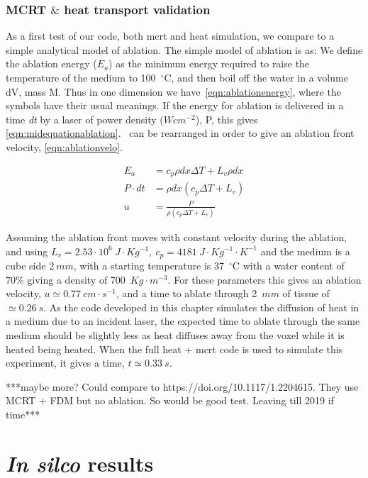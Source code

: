 \subsubsection{MCRT $\&$ heat transport validation}

As a first test of our code, both \gls{mcrt} and heat simulation, we compare to a simple analytical model of ablation. The simple model of ablation is as: We define the ablation energy ($E_a$) as the minimum energy required to raise the temperature of the medium to 100~$^{\circ}$C, and then boil off the water in a volume dV, mass M. Thus in one dimension we have~\cref{eqn:ablationenergy}, where the symbols have their usual meanings. If the energy for ablation is delivered in a time \textit{dt} by a laser of power density ($Wcm^{-2}$), P, this gives \cref{eqn:midequationablation}.~ can be rearranged in order to give an ablation front velocity, \cref{eqn:ablationvelo}.


\begin{align}
E_a &= c_p \rho dx \Delta T + L_v \rho dx \label{eqn:ablationenergy}\\
P\cdot dt &= \rho dx (c_p \Delta T + L_v) \label{eqn:midequationablation} \\
u &= \frac{P}{\rho(c_p\Delta T+ L_v)} \label{eqn:ablationvelo}
\end{align}

Assuming the ablation front moves with constant velocity during the ablation, and using $L_v=2.53\cdot 10^6\ J\cdot Kg^{-1},\ c_p=4181\ J\cdot Kg^{-1}\cdot K^{-1}$ and the medium is a cube side $2\ mm$, with a starting temperature is 37~$^{\circ}$C with a water content of 70\% giving a density of 700~$Kg\cdot m^{-3}$. For these parameters this gives an ablation velocity, $u\simeq 0.77\ cm\cdot s^{-1}$, and a time to ablate through 2~$mm$ of tissue of $\simeq 0.26~s$.
As the code developed in this chapter simulates the diffusion of heat in a medium due to an incident laser, the expected time to ablate through the same medium should be slightly less as heat diffuses away from the voxel while it is heated being heated. When the full heat + \gls{mcrt} code is used to simulate this experiment, it gives a time, $t \simeq 0.33~s$.	

\medskip

***maybe more? Could compare to https://doi.org/10.1117/1.2204615. They use MCRT + FDM but no ablation. So would be good test. Leaving till 2019 if time***


\section{\textit{In silco} results} 

